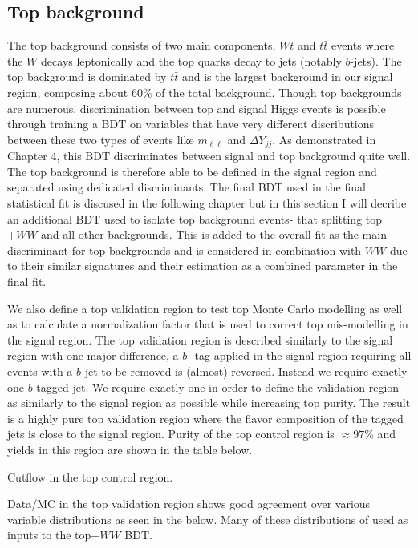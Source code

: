 \subsection{Top background}
The top background consists of two main components, $Wt$ and $t\bar{t}$ events where the $W$ decays leptonically and the top quarks decay to jets (notably $b$-jets). The top background is dominated by $t\bar{t}$ and is the largest background in our signal region, composing about $60\%$ of the total background. Though top backgrounds are numerous, discrimination between top and signal Higgs events is possible through training a BDT on variables that have very different discributions between these two types of events like $m_{\ell\ell}$ and $\Delta Y_{jj}$. As demonstrated in Chapter 4, this BDT discriminates between signal and top background quite well. The top background is therefore able to be defined in the signal region and separated using dedicated discriminants. The final BDT used in the final statistical fit is discused in the following chapter but in this section I will decribe an additional BDT used to isolate top background events- that splitting top$+WW$ and all other backgrounds. This is added to the overall fit as the main discriminant for top backgrounds and is considered in combination with $WW$ due to their similar signatures and their estimation as a combined parameter in the final fit.  

We also define a top validation region to test top Monte Carlo modelling as well as to calculate a normalization factor that is used to correct top mis-modelling in the signal region. The top validation region is described similarly to the signal region with one major difference, a $b$- tag applied in the signal region requiring all events with a $b$-jet to be removed is (almost) reversed. Instead we require exactly one $b$-tagged jet. We require exactly one in order to define the validation region as similarly to the signal region as possible while increasing top purity. The result is a highly pure top validation region where the flavor composition of the tagged jets is close to the signal region. Purity of the top control region is $\approx 97\%$ and yields in this region are shown in the table below.

\begin{table}[h!]
\scalebox{0.4}{

}
\caption{Cutflow in the top control region.}
\label{tab:topcr}
\end{table}

Data/MC in the top validation region shows good agreement over various variable distributions as seen in the  below. Many of these distributions of used as inputs to the top$+WW$ BDT. 

